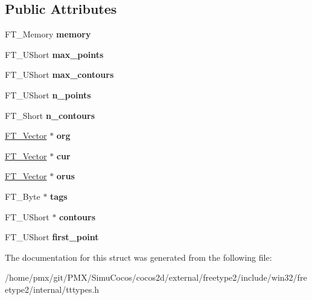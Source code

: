 \subsection*{Public Attributes}
\begin{DoxyCompactItemize}
\item 
\mbox{\label{structTT__GlyphZoneRec___adc8cac6d6d8475aa50946d6bc17fd345}} 
F\+T\+\_\+\+Memory {\bfseries memory}
\item 
\mbox{\label{structTT__GlyphZoneRec___aa06aa1bfd1b7e2082552ea24f96c775e}} 
F\+T\+\_\+\+U\+Short {\bfseries max\+\_\+points}
\item 
\mbox{\label{structTT__GlyphZoneRec___a268ef8e7a7da1c077c762d04089b2605}} 
F\+T\+\_\+\+U\+Short {\bfseries max\+\_\+contours}
\item 
\mbox{\label{structTT__GlyphZoneRec___a2acc389958f0e593f7eed29f7ca15b94}} 
F\+T\+\_\+\+U\+Short {\bfseries n\+\_\+points}
\item 
\mbox{\label{structTT__GlyphZoneRec___a1aa2ffa863fbd8a8985fe3e39e8bb92a}} 
F\+T\+\_\+\+Short {\bfseries n\+\_\+contours}
\item 
\mbox{\label{structTT__GlyphZoneRec___a1cc919812e2b18b0cbe42cee51352bf2}} 
\hyperlink{structFT__Vector__}{F\+T\+\_\+\+Vector} $\ast$ {\bfseries org}
\item 
\mbox{\label{structTT__GlyphZoneRec___ad22c5f4ef4658c5fe7349409f1f100d9}} 
\hyperlink{structFT__Vector__}{F\+T\+\_\+\+Vector} $\ast$ {\bfseries cur}
\item 
\mbox{\label{structTT__GlyphZoneRec___a7398c2acae1685395e5e17e8e5719dd6}} 
\hyperlink{structFT__Vector__}{F\+T\+\_\+\+Vector} $\ast$ {\bfseries orus}
\item 
\mbox{\label{structTT__GlyphZoneRec___a69d22e49884288b646b3793e04a60ce1}} 
F\+T\+\_\+\+Byte $\ast$ {\bfseries tags}
\item 
\mbox{\label{structTT__GlyphZoneRec___a69ae3c3df288c1c9cc8a71e6fc0bf8dd}} 
F\+T\+\_\+\+U\+Short $\ast$ {\bfseries contours}
\item 
\mbox{\label{structTT__GlyphZoneRec___a9d655be80b3e31652f69ede54458faaf}} 
F\+T\+\_\+\+U\+Short {\bfseries first\+\_\+point}
\end{DoxyCompactItemize}


The documentation for this struct was generated from the following file\+:\begin{DoxyCompactItemize}
\item 
/home/pmx/git/\+P\+M\+X/\+Simu\+Cocos/cocos2d/external/freetype2/include/win32/freetype2/internal/tttypes.\+h\end{DoxyCompactItemize}
